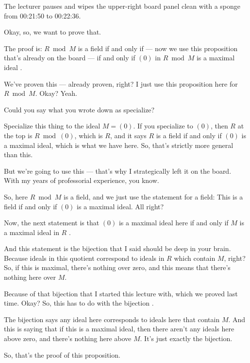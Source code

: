 \begin{note}
The lecturer pauses and wipes the upper-right board panel clean with a sponge from 00:21:50 to 00:22:36.
\end{note}

\begin{speech}[00:22:36 - 00:23:14]
Okay, so, we want to prove that.

The proof is: $R \bmod M$ is a field if and only if --- now we use this proposition that's already on the board --- if and only if $(0)$ in $R \bmod M$ is a maximal ideal .

We've proven this --- already proven, right?  I just use this proposition here for $R \bmod M$. Okay? Yeah.
\end{speech}

\begin{student}
Could you say what you wrote down as specialize?
\end{student}

\begin{speech}[00:23:17 - 00:23:57]
Specialize this thing to the ideal $M = (0)$. If you specialize to $(0)$, then $R$ at the top is $R \bmod (0)$, which is $R$, and it says $R$ is a field if and only if $(0)$ is a maximal ideal, which is what we have here. So, that's strictly more general than this.

But we're going to use this --- that's why I strategically left it on the board. With my years of professorial experience, you know. 

So, here $R \bmod M$ is a field, and we just use the statement for a field: This is a field if and only if $(0)$ is a maximal ideal. All right?
\end{speech}

\begin{speech}[00:23:57 - 00:25:02]
Now, the next statement is that $(0)$ is a maximal ideal here if and only if $M$ is a maximal ideal in $R$ .

And this statement is the bijection that I said should be deep in your brain. Because ideals in this quotient correspond to ideals in $R$ which contain $M$, right? So, if this is maximal, there's nothing over zero, and this means that there's nothing here over $M$.

Because of that bijection that I started this lecture with, which we proved last time. Okay? So, this has to do with the bijection .

The bijection says any ideal here corresponds to ideals here that contain $M$. And this is saying that if this is a maximal ideal, then there aren't any ideals here above zero, and there's nothing here above $M$. It's just exactly the bijection.

So, that's the proof of this proposition.
\end{speech}

